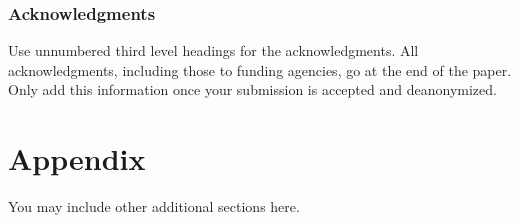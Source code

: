 \documentclass[10pt]{article} %
\begin{document}
\newline
\appendix



 

\subsubsection*{Acknowledgments}
Use unnumbered third level headings for the acknowledgments. All
acknowledgments, including those to funding agencies, go at the end of the paper.
Only add this information once your submission is accepted and deanonymized. 

 
 

\appendix
\section{Appendix}
You may include other additional sections here.
\end{document}
